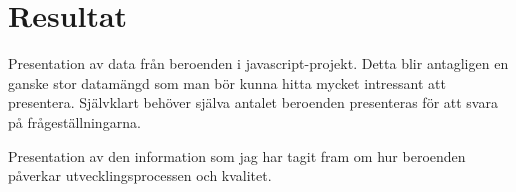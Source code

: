 \section{Resultat}
\label{sec:joel_a-results}
Presentation av data från beroenden i javascript-projekt. Detta blir antagligen en ganske stor datamängd som man bör kunna hitta mycket intressant att presentera. Självklart behöver själva antalet beroenden presenteras för att svara på frågeställningarna.

Presentation av den information som jag har tagit fram om hur beroenden påverkar utvecklingsprocessen och kvalitet.
